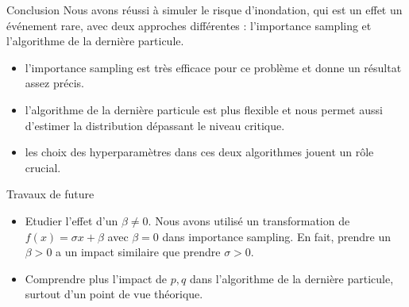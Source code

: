 \documentclass{beamer}
\begin{document}
\begin{frame}{Conclusion}
    Nous avons réussi à simuler le risque d'inondation, qui est un effet un événement rare, avec deux approches différentes : l'importance sampling et l'algorithme de la dernière particule. 
    \begin{itemize}
        \item l'importance sampling est très efficace pour ce problème et donne un résultat assez précis.
        \item l'algorithme de la dernière particule est plus flexible et nous permet aussi d'estimer la distribution dépassant le niveau critique.
        \item les choix des hyperparamètres dans ces deux algorithmes jouent un rôle crucial.
    \end{itemize}
\end{frame}

\begin{frame}{Travaux de future}
    \begin{itemize}
        \item Etudier l'effet d'un $\beta\ne 0$. Nous avons utilisé un transformation de $f(x)=\sigma x+\beta$ avec $\beta =0$ dans importance sampling. En fait, prendre un $\beta>0$ a un impact similaire que prendre $\sigma>0$.
        \item Comprendre plus l'impact de $p,q$ dans l'algorithme de la dernière particule, surtout d'un point de vue théorique.
    \end{itemize}
\end{frame}
\end{document}
